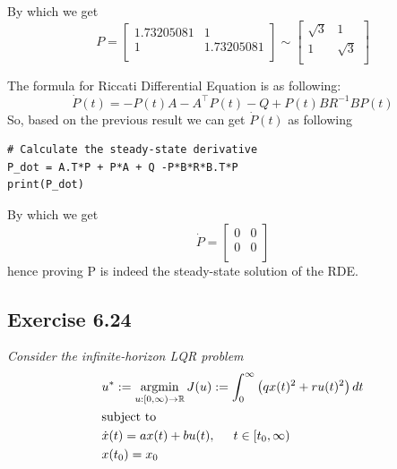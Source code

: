 By which we get 
\begin{equation}
    P = \begin{bmatrix}
         1.73205081 & 1 \\
         1 & 1.73205081 \\
    \end{bmatrix}
    \sim \begin{bmatrix}
         \sqrt{3} & 1 \\
         1 & \sqrt{3} \\
    \end{bmatrix}
\end{equation}

The formula for Riccati Differential Equation is as following:
\begin{equation}
    \Dot{P}(t) = -P(t)A - A^\top P(t) -Q + P(t) B R^{-1} B P(t) 
\end{equation}
So, based on the previous result we can get $ \Dot{P}(t) $ as following
\begin{verbatim}
# Calculate the steady-state derivative
P_dot = A.T*P + P*A + Q -P*B*R*B.T*P 
print(P_dot)
\end{verbatim}
By which we get 
\begin{equation}
    \Dot{P} = \begin{bmatrix}
         0 & 0\\
         0 & 0\\
    \end{bmatrix}
\end{equation}
hence proving P is indeed the steady-state solution of the RDE.


\subsection{Exercise 6.24}
\emph{Consider the infinite-horizon LQR problem}
\begin{align}
    &u^* := \operatorname*{argmin}_{u:[0,\infty) \to \mathbb{R}} J(u) := \int_0^\infty \left( qx(t)^2 + ru(t)^2  \right) dt \\
    &\text{subject to}\\
    &\Dot{x}(t) = ax(t) + bu(t), \hspace{0.5cm} t \in [t_0, \infty) \\
    &x(t_0) = x_0
\end{align}

